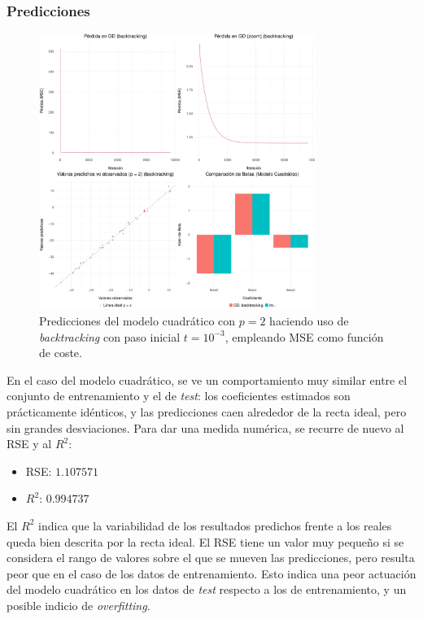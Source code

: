 \documentclass[11pt]{opticajnl}
\begin{document}
\subsubsection{Predicciones}

\begin{figure}[H]
\centering
\includegraphics[width=0.8\textwidth]{fotos/plot_cuad_pred.pdf}
\caption{Predicciones del modelo cuadrático con $p=2$ haciendo uso de \textit{backtracking} con paso inicial $t = 10^{-3}$, empleando MSE como función de coste.}
\label{fig:33}
\end{figure}

En el caso del modelo cuadrático, se ve un comportamiento muy similar entre el conjunto de entrenamiento y el de \textit{test}: los coeficientes estimados son prácticamente idénticos, y las predicciones caen alrededor de la recta ideal, pero sin grandes desviaciones. Para dar una medida numérica, se recurre de nuevo al RSE y al $R^2$:
\begin{multicols}{2}
\begin{itemize}
\item RSE: $1.107571$
\item $R^2$: $0.994737$
\end{itemize}
\end{multicols}

El $R^2$ indica que la variabilidad de los resultados predichos frente a los reales queda bien descrita por la recta ideal. El RSE tiene un valor muy pequeño si se considera el rango de valores sobre el que se mueven las predicciones, pero resulta peor que en el caso de los datos de entrenamiento. Esto indica una peor actuación del modelo cuadrático en los datos de \textit{test} respecto a los de entrenamiento, y un posible indicio de \textit{overfitting}.
\end{document}

